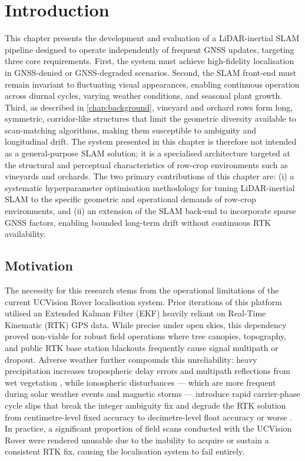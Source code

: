 \section{Introduction}
\label{sec:slam-intro}
This chapter presents the development and evaluation of a LiDAR-inertial SLAM pipeline designed to operate independently of frequent GNSS updates, targeting three core requirements. First, the system must achieve high-fidelity localisation in GNSS-denied or GNSS-degraded scenarios. Second, the SLAM front-end must remain invariant to fluctuating visual appearances, enabling continuous operation across diurnal cycles, varying weather conditions, and seasonal plant growth. Third, as described in \cref{chap:background}, vineyard and orchard rows form long, symmetric, corridor-like structures that limit the geometric diversity available to scan-matching algorithms, making them susceptible to ambiguity and longitudinal drift. The system presented in this chapter is therefore not intended as a general-purpose SLAM solution; it is a specialised architecture targeted at the structural and perceptual characteristics of row-crop environments such as vineyards and orchards. The two primary contributions of this chapter are: (i) a systematic hyperparameter optimisation methodology for tuning LiDAR-inertial SLAM to the specific geometric and operational demands of row-crop environments, and (ii) an extension of the SLAM back-end to incorporate sparse GNSS factors, enabling bounded long-term drift without continuous RTK availability.

\subsection{Motivation}
\label{subsec:slam-motivation}
The necessity for this research stems from the operational limitations of the current UCVision Rover localisation system. Prior iterations of this platform utilised an Extended Kalman Filter (EKF) heavily reliant on Real-Time Kinematic (RTK) GPS data. While precise under open skies, this dependency proved non-viable for robust field operations where tree canopies, topography, and public RTK base station blackouts frequently cause signal multipath or dropout. Adverse weather further compounds this unreliability: heavy precipitation increases tropospheric delay errors \cite{solheimPropagationDelaysGPSSignals1999} and multipath reflections from wet vegetation \cite{nievinskiForwardModelingGPSMultipath2014}, while ionospheric disturbances — which are more frequent during solar weather events and magnetic storms — introduce rapid carrier-phase cycle slips that break the integer ambiguity fix and degrade the RTK solution from centimetre-level fixed accuracy to decimetre-level float accuracy or worse \cite{wielgoszAnalysisNetworkRTKIonospheric2005}. In practice, a significant proportion of field scans conducted with the UCVision Rover were rendered unusable due to the inability to acquire or sustain a consistent RTK fix, causing the localisation system to fail entirely.

